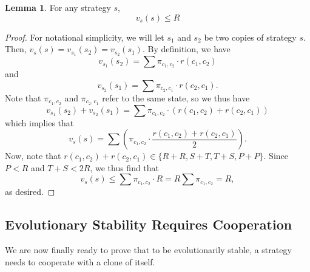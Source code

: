 \documentclass[11pt]{amsart}
\theoremstyle{definition}
\newtheorem{lemma}[theorem]{Lemma}
\theoremstyle{remark}
\begin{document}
\begin{lemma}
  \label{neverbetterthanr}
  For any strategy $s$,
  \begin{equation*}
    v_{s}(s) \leq R
  \end{equation*}
\end{lemma}
\begin{proof}
  For notational simplicity, we will let $s_1$ and $s_2$ be two copies of strategy $s$. Then, $v_{s}(s) = v_{s_1}(s_2) = v_{s_2}(s_1)$. By definition, we have
  \begin{equation*}
    v_{s_1}(s_2) = \sum \pi_{c_1,c_2} \cdot r(c_1, c_2)
  \end{equation*}
  and
  \begin{equation*}
    v_{s_2}(s_1) = \sum \pi_{c_2,c_1} \cdot r(c_2, c_1).
  \end{equation*}
  Note that $\pi_{c_1,c_2}$ and $\pi_{c_2,c_1}$ refer to the same state, so we thus have \begin{equation*}
    v_{s_1}(s_2) + v_{s_2}(s_1) = \sum \pi_{c_1,c_2} \cdot (r(c_1,c_2) + r(c_2,c_1))
  \end{equation*}
  which implies that \begin{equation*}
    v_s(s) = \sum \left( \pi_{c_1,c_2} \cdot \frac{r(c_1,c_2) + r(c_2,c_1)}{2} \right).
  \end{equation*}
  Now, note that $r(c_1,c_2) + r(c_2,c_1) \in \{R + R, S + T, T+S, P + P\}$. Since $P < R$ and $T + S < 2R$, we thus find that \begin{equation*}
    v_s(s) \leq \sum \pi_{c_1,c_2} \cdot R = R \sum \pi_{c_1,c_2} = R,
  \end{equation*}
  as desired.
\end{proof}

\subsection{Evolutionary Stability Requires Cooperation}

  We are now finally ready to prove that to be evolutionarily stable, a strategy needs to cooperate with a clone of itself.
\end{document}
